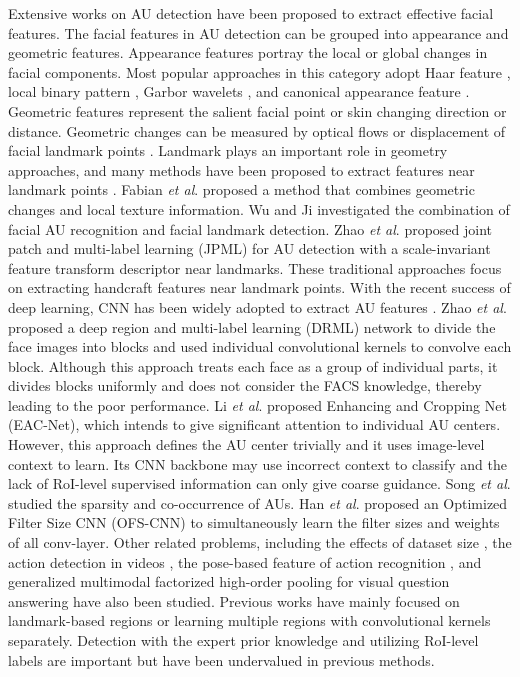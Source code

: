 \documentclass[5p,twocolumn]{elsarticle}
\newcommand{\etal}{\textit{et al}. }
\begin{document}
Extensive works on AU detection have been proposed to extract effective facial features. The facial features in AU detection can be grouped into appearance and geometric features. Appearance features portray the local or global changes in facial components. Most popular approaches in this category adopt Haar feature \cite{whitehill2006haar}, local binary pattern \cite{jiang2011action}, Garbor wavelets \cite{bazzo2004recognizing,valstar2006fully}, and canonical appearance feature \cite{lucey2010extended}. Geometric features represent the salient facial point or skin changing direction or distance. Geometric changes can be measured by optical flows \cite{lien2000detection} or displacement of facial landmark points \cite{valstar2012fully,lucey2010extended}. Landmark plays an important role in geometry approaches, and many methods have been proposed to extract features near landmark points \cite{eleftheriadis2015multi,koelstra2010dynamic,wang2013capturing,chu2013selective,ding2013facial,zeng2015confidence,liu2013aware,valstar2015fera, yu2018rethining}. Fabian \etal \cite{fabian2016emotionet} proposed a method that combines geometric changes and local texture information. Wu and Ji \cite{Wu2016} investigated the combination of facial AU recognition and facial landmark detection. Zhao \etal \cite{Zhao2016} proposed joint patch and multi-label learning (JPML) for AU detection with a scale-invariant feature transform descriptor near landmarks. These traditional approaches focus on extracting handcraft features near landmark points. With the recent success of deep learning, CNN has been widely adopted to extract AU features \cite{han2017optimizing}. Zhao \etal \cite{Zhao2016b} proposed a deep region and multi-label learning (DRML) network to divide the face images into  blocks and used individual convolutional kernels to convolve each block. Although this approach treats each face as a group of individual parts, it divides blocks uniformly and does not consider the FACS knowledge, thereby leading to the poor performance.
Li \etal \cite{li2017eac} proposed Enhancing and Cropping Net (EAC-Net), which intends to give significant attention to individual AU centers. However, this approach defines the AU center trivially and it uses image-level context to learn. Its CNN backbone may use incorrect context to classify and the lack of RoI-level supervised information can only give coarse guidance. Song \etal \cite{song2015exploiting} studied the sparsity and co-occurrence of AUs. Han \etal \cite{han2017optimizing} proposed an Optimized Filter Size CNN (OFS-CNN) to simultaneously learn the filter sizes and weights of all conv-layer.
Other related problems, including the effects of dataset size \cite{girard2015much}, the action detection in videos \cite{hou2017tube}, the pose-based feature of action recognition \cite{cheron2015p}, and generalized multimodal factorized high-order pooling for visual question answering \cite{yu2018beyond} have also been studied. Previous works have mainly focused on landmark-based regions or learning multiple regions with convolutional kernels separately. Detection with the expert prior knowledge and utilizing RoI-level labels are important but have been undervalued in previous methods.
\end{document}
